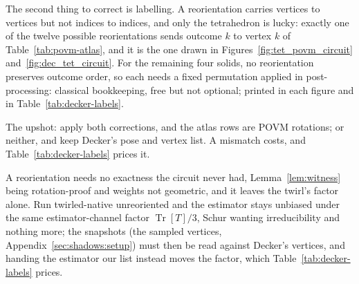 \documentclass[11pt, oneside, openany]{scrbook}
\DeclareMathOperator{\Tr}{Tr}
\begin{document}
The second thing to correct is labelling. A reorientation carries vertices to vertices but not indices to indices, and only the tetrahedron is lucky: exactly one of the twelve possible reorientations sends outcome $k$ to vertex $k$ of Table~\ref{tab:povm-atlas}, and it is the one drawn in Figures~\ref{fig:tet_povm_circuit} and~\ref{fig:dec_tet_circuit}. For the remaining four solids, no reorientation preserves outcome order, so each needs a fixed permutation applied in post-processing: classical bookkeeping, free but not optional; printed in each figure and in Table~\ref{tab:decker-labels}.

The upshot: apply both corrections, and the atlas rows are POVM rotations; or neither, and keep Decker's pose and vertex list. A mismatch costs, and Table~\ref{tab:decker-labels} prices it.

A reorientation needs no exactness the circuit never had, Lemma~\ref{lem:witness} being rotation-proof and weights not geometric, and it leaves the twirl's factor alone. Run twirled-native unreoriented and the estimator stays unbiased under the same estimator-channel factor $\Tr[T]/3$, Schur wanting irreducibility and nothing more; the snapshots (the sampled vertices, Appendix~\ref{sec:shadows:setup}) must then be read against Decker's vertices, and handing the estimator our list instead moves the factor, which Table~\ref{tab:decker-labels} prices.

\end{document}
